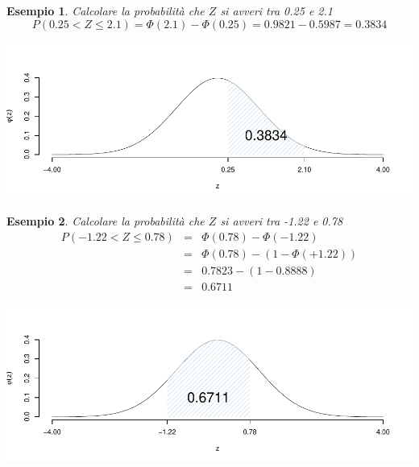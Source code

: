 \documentclass[
  11pt,
]{book}
\theoremstyle{mytheoremstyle}
\theoremstyle{mydefstyle}
\newtheorem{example}{{Esempio}}[section]
\begin{document}
\begin{example}

Calcolare la probabilità che \(Z\) si avveri tra 0.25 e 2.1
\[P(0.25< Z \leq 2.1) = \Phi(2.1)-\Phi(0.25)=0.9821-0.5987=0.3834\]

\begin{center}\includegraphics{Appunti_di_Statistica_2025_files/figure-latex/07c-Normale-21-1} \end{center}

\end{example}

\begin{example}

Calcolare la probabilità che \(Z\) si avveri tra -1.22 e 0.78
\begin{eqnarray*}
P(-1.22< Z \leq 0.78) &=& \Phi(0.78)-\Phi(-1.22) \\
                         &=& \Phi(0.78)-(1-\Phi(+1.22)) \\
                         &=& 0.7823-(1-0.8888)\\
                         &=& 0.6711
\end{eqnarray*}

\begin{center}\includegraphics{Appunti_di_Statistica_2025_files/figure-latex/07c-Normale-23-1} \end{center}

\end{example}
\end{document}
